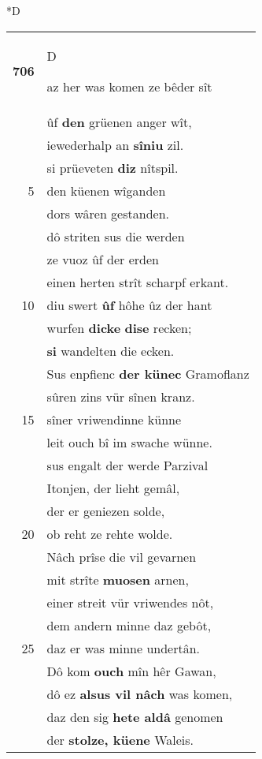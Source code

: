 \documentclass[8pt,a4paper,notitlepage]{article}
\begin{document}
\begin{table}[ht]
\begin{minipage}[t]{0.5\linewidth}
\small
\begin{center}*D
\end{center}
\begin{tabular}{rl}
\textbf{706} & \begin{large}D\end{large}az her was komen ze bêder sît\\ 
 & ûf \textbf{den} grüenen anger wît,\\ 
 & iewederhalp an \textbf{sîniu} zil.\\ 
 & si prüeveten \textbf{diz} nîtspil.\\ 
5 & den küenen wîganden\\ 
 & dors wâren gestanden.\\ 
 & dô striten sus die werden\\ 
 & ze vuoz ûf der erden\\ 
 & einen herten strît scharpf erkant.\\ 
10 & diu swert \textbf{ûf} hôhe ûz der hant\\ 
 & wurfen \textbf{dicke} \textbf{dise} recken;\\ 
 & \textbf{si} wandelten die ecken.\\ 
 & Sus enpfienc \textbf{der künec} Gramoflanz\\ 
 & sûren zins vür sînen kranz.\\ 
15 & sîner vriwendinne künne\\ 
 & leit ouch bî im swache wünne.\\ 
 & sus engalt der werde Parzival\\ 
 & Itonjen, der lieht gemâl,\\ 
 & der er geniezen solde,\\ 
20 & ob reht ze rehte wolde.\\ 
 & Nâch prîse die vil gevarnen\\ 
 & mit strîte \textbf{muosen} arnen,\\ 
 & einer streit vür vriwendes nôt,\\ 
 & dem andern minne daz gebôt,\\ 
25 & daz er was minne undertân.\\ 
 & Dô kom \textbf{ouch} mîn hêr Gawan,\\ 
 & dô ez \textbf{alsus vil nâch} was komen,\\ 
 & daz den sig \textbf{hete aldâ} genomen\\ 
 & der \textbf{stolze, küene} Waleis.\\ 

\end{tabular}
\end{minipage}
\end{table}
\end{document}
